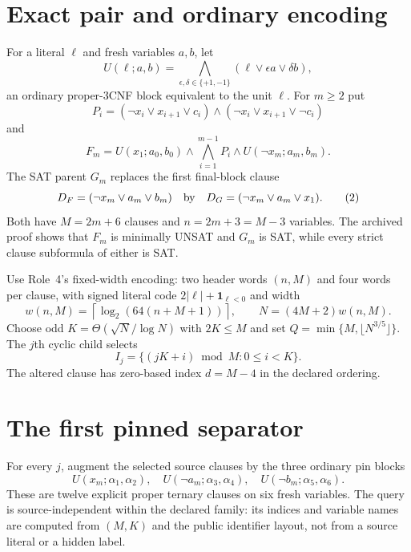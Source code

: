 \documentclass[11pt]{article}
\begin{document}
\section{Exact pair and ordinary encoding}
For a literal $\ell$ and fresh variables $a,b$, let
\[
 U(\ell;a,b)=\bigwedge_{\epsilon,\delta\in\{+1,-1\}}
 (\ell\vee \epsilon a\vee\delta b),
\]
an ordinary proper-3CNF block equivalent to the unit $\ell$.  For $m\ge2$
put
\[
 P_i=(\neg x_i\vee x_{i+1}\vee c_i)\wedge
     (\neg x_i\vee x_{i+1}\vee\neg c_i)
\]
and
\[
 F_m=U(x_1;a_0,b_0)\wedge\bigwedge_{i=1}^{m-1}P_i
      \wedge U(\neg x_m;a_m,b_m).
\tag{1}
\]
The SAT parent $G_m$ replaces the first final-block clause
\[
 D_F=(\neg x_m\vee a_m\vee b_m)
 \quad\hbox{by}\quad
 D_G=(\neg x_m\vee a_m\vee x_1).
\tag{2}
\]
Both have $M=2m+6$ clauses and $n=2m+3=M-3$ variables.  The archived proof
shows that $F_m$ is minimally UNSAT and $G_m$ is SAT, while every strict
clause subformula of either is SAT.

Use Role~4's fixed-width encoding: two header words $(n,M)$ and four words
per clause, with signed literal code $2|\ell|+\mathbf1_{\ell<0}$ and width
\[
 w(n,M)=\left\lceil\log_2(64(n+M+1))\right\rceil,
 \qquad N=(4M+2)w(n,M).
\tag{3}
\]
Choose odd $K=\Theta(\sqrt N/\log N)$ with $2K\le M$ and set
$Q=\min\{M,\lfloor N^{3/5}\rfloor\}$.  The $j$th cyclic child selects
\[
 I_j=\{(jK+i)\bmod M:0\le i<K\}.
\tag{4}
\]
The altered clause has zero-based index $d=M-4$ in the declared ordering.

\section{The first pinned separator}
For every $j$, augment the selected source clauses by the three ordinary
pin blocks
\[
 U(x_m;\alpha_1,\alpha_2),\quad
 U(\neg a_m;\alpha_3,\alpha_4),\quad
 U(\neg b_m;\alpha_5,\alpha_6).
\tag{5}
\]
These are twelve explicit proper ternary clauses on six fresh variables.
The query is source-independent within the declared family: its indices and
variable names are computed from $(M,K)$ and the public identifier layout,
not from a source literal or a hidden label.
\end{document}
